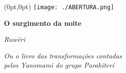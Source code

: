 \thispagestyle{empty}

\begin{textblock*}{-2in}(0pt,0pt)%
\vspace*{-2.4cm}
\hspace*{-3cm}\texttt{[image: ./ABERTURA.png]}  
\end{textblock*}

\pagebreak
\blankpage






\begingroup\thispagestyle{empty}\vspace*{.05\textheight} 

              \formular
              \huge
              \noindent
              \textbf{O surgimento da noite}
              
              \vspace{0.3em}

              \noindent\Large\textit{Ruwëri}

              \vspace{0.6em}

              \noindent\normalsize\textit{Ou o livro das transformações contadas\\pelos Yanomami do  grupo Parahiteri}

\endgroup
\vfill
\pagebreak